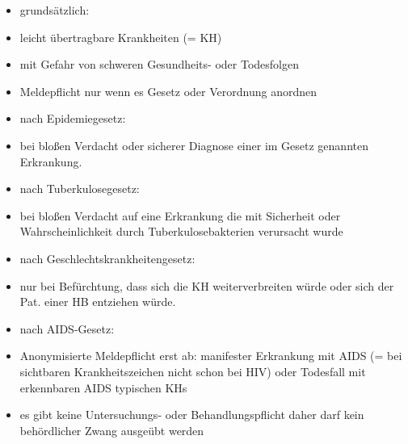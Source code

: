 \documentclass{article}
\begin{document}
\begin{itemize}
\item grunds\"atzlich:

\end{itemize}
\begin{itemize}
\item leicht \"ubertragbare Krankheiten (= KH)

\item mit Gefahr von schweren Gesundheits- oder Todesfolgen

\item Meldepflicht nur wenn es Gesetz oder Verordnung anordnen

\end{itemize}
\begin{itemize}
\item nach Epidemiegesetz: 

\end{itemize}
\begin{itemize}
\item bei blo{\ss}en Verdacht oder sicherer Diagnose einer im Gesetz
genannten Erkrankung.

\end{itemize}
\begin{itemize}
\item nach Tuberkulosegesetz:

\end{itemize}
\begin{itemize}
\item bei blo{\ss}en Verdacht auf eine Erkrankung die mit Sicherheit
oder Wahrscheinlichkeit durch Tuberkulosebakterien verursacht wurde

\end{itemize}
\begin{itemize}
\item nach Geschlechtskrankheitengesetz:

\end{itemize}
\begin{itemize}
\item nur bei Bef\"urchtung, dass sich die KH weiterverbreiten w\"urde
oder sich der Pat. einer HB entziehen w\"urde.

\end{itemize}
\begin{itemize}
\item nach AIDS-Gesetz:

\end{itemize}
\begin{itemize}
\item Anonymisierte Meldepflicht erst ab: manifester Erkrankung mit AIDS
(= bei sichtbaren Krankheitszeichen  nicht schon bei HIV) oder
Todesfall mit erkennbaren AIDS typischen KHs

\item es gibt keine Untersuchungs- oder Behandlungspflicht daher darf
kein beh\"ordlicher Zwang ausge\"ubt werden

\end{itemize}
\end{document}
